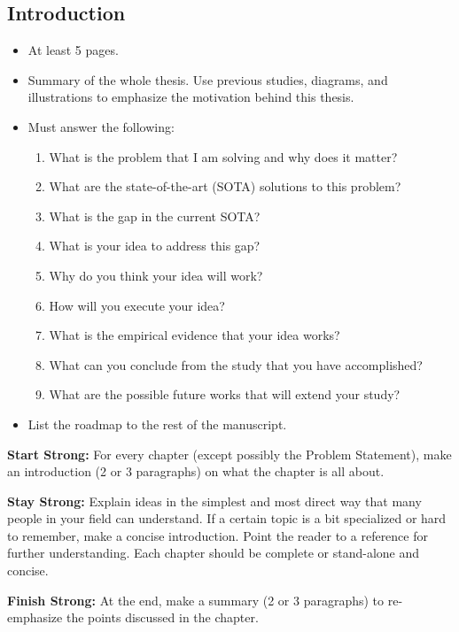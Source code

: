 \begin{singlespace}
    \chapter{Introduction}
\end{singlespace}

\begin{itemize}
    \item At least 5 pages.
    \item Summary of the whole thesis. Use previous studies, diagrams, and illustrations to emphasize the motivation behind this thesis.
    \item Must answer the following:
    \begin{enumerate}
        \item What is the problem that I am solving and why does it matter?
        \item What are the state-of-the-art (SOTA) solutions to this problem?
        \item What is the gap in the current SOTA?
        \item What is your idea to address this gap?
        \item Why do you think your idea will work?
        \item How will you execute your idea?
        \item What is the empirical evidence that your idea works?
        \item What can you conclude from the study that you have accomplished?
        \item What are the possible future works that will extend your study?
    \end{enumerate}
    \item List the roadmap to the rest of the manuscript.
\end{itemize}

\textbf{Start Strong:} For every chapter (except possibly the Problem Statement), make an introduction (2 or 3 paragraphs) on what the chapter is all about.

\textbf{Stay Strong:} Explain ideas in the simplest and most direct way that many people in your field can understand. If a certain topic is a bit specialized or hard to remember, make a concise introduction. Point the reader to a reference for further understanding. Each chapter should be complete or stand-alone and concise.

\textbf{Finish Strong:} At the end, make a summary (2 or 3 paragraphs) to re-emphasize the points discussed in the chapter.

